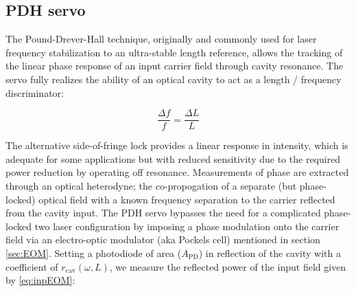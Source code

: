 \subsection{PDH servo}\label{subsubsec:pdh}
The Pound-Drever-Hall technique, originally and commonly used for laser frequency stabilization to an ultra-stable length reference, allows the tracking of the linear phase response of an input carrier field through cavity resonance. The servo fully realizes the ability of an optical cavity to act as a length / frequency discriminator:

\begin{equation}\label{eq:cavlf}
	\frac{\Delta f}{f} = \frac{\Delta L}{L}
\end{equation}

\noindent The alternative side-of-fringe lock provides a linear response in intensity, which is adequate for some applications but with reduced sensitivity due to the required power reduction by operating off resonance. Measurements of phase are extracted through an optical heterodyne; the co-propogation of a separate (but phase-locked) optical field with a known frequency separation to the carrier reflected from the cavity input. The PDH servo bypasses the need for a complicated phase-locked two laser configuration by imposing a phase modulation onto the carrier field via an electro-optic modulator (aka Pockels cell) mentioned in section \autoref{sec:EOM}. Setting a photodiode of area ($A_\mathrm{PD}$) in reflection of the cavity with a coefficient of $r_\mathrm{cav}(\omega,L)$, we measure the reflected power of the input field given by \autoref{eq:inpEOM}\;:


%




